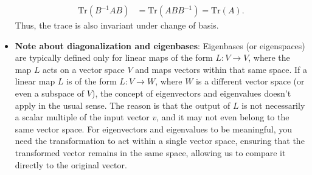 \documentclass{report}
\begin{document}
\begin{itemize}
            \begin{align*}
                \text{Tr}(B^{-1}AB) &= \text{Tr}(ABB^{-1}) = \text{Tr}(A)
            .\end{align*}
            \bigbreak \noindent 
            Thus, the trace is also invariant under change of basis.
        \item \textbf{Note about diagonalization and eigenbases}: Eigenbases (or eigenspaces) are typically defined only for linear maps of the form 
            \( L: V \to V \), where the map \( L \) acts on a vector space \( V \) and maps vectors within that same space. 
            \bigbreak \noindent 
            If a linear map \( L \) is of the form \( L: V \to W \), where \( W \) is a different vector space (or even a subspace of \( V \)), the concept of eigenvectors and eigenvalues doesn’t apply in the usual sense. The reason is that the output of \( L \) is not necessarily a scalar multiple of the input vector \( v \), and it may not even belong to the same vector space.
            \bigbreak \noindent 
            For eigenvectors and eigenvalues to be meaningful, you need the transformation to act within a single vector space, ensuring that the transformed vector remains in the same space, allowing us to compare it directly to the original vector.




    \end{itemize}

    \pagebreak 
\end{document}
